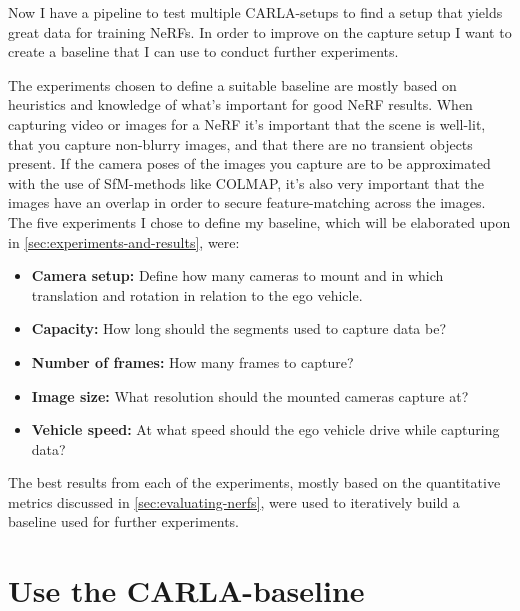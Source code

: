 Now I have a pipeline to test multiple CARLA-setups to find a setup that yields great data for training NeRFs. In order to improve on the capture setup I want to create a baseline that I can use to conduct further experiments.

The experiments chosen to define a suitable baseline are mostly based on heuristics and knowledge of what's important for good NeRF results. When capturing video or images for a NeRF it’s important that the scene is well-lit, that you capture non-blurry images, and that there are no transient objects present. If the camera poses of the images you capture are to be approximated with the use of SfM-methods like COLMAP, it's also very important that the images have an overlap in order to secure feature-matching across the images. The five experiments I chose to define my baseline, which will be elaborated upon in \autoref{sec:experiments-and-results}, were:

\begin{itemize}
    \item \textbf{Camera setup:} Define how many cameras to mount and in which translation and rotation in relation to the ego vehicle.
    \item \textbf{Capacity:} How long should the segments used to capture data be?
    \item \textbf{Number of frames:} How many frames to capture?
    \item \textbf{Image size:} What resolution should the mounted cameras capture at?
    \item \textbf{Vehicle speed:} At what speed should the ego vehicle drive while capturing data?
\end{itemize}

The best results from each of the experiments, mostly based on the quantitative metrics discussed in \autoref{sec:evaluating-nerfs}, were used to iteratively build a baseline used for further experiments.
















\section{Use the CARLA-baseline}
\begin{comment}
Premise: Have a CARLA-baseline for further experiments
Question: Which further experiments should I conduct?

\begin{itemize}
    \item Find the efficiency of pose refinement
\end{itemize}
\end{comment}

